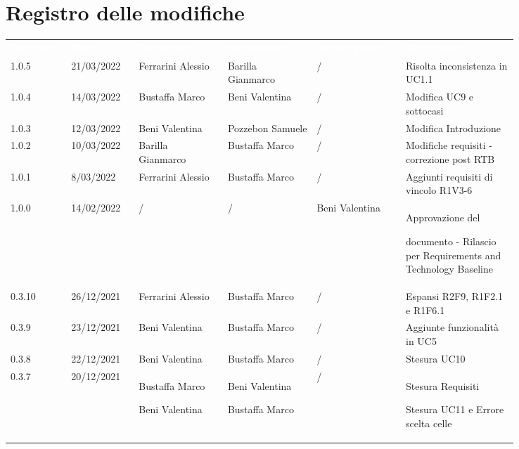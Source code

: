\section*{Registro delle modifiche}

{\renewcommand{\arraystretch}{1.5}
\scriptsize
\begin{tabular}{p{0.10\linewidth}p{0.10\linewidth}p{0.15\linewidth}p{0.15\linewidth}p{0.15\linewidth}p{0.19\linewidth}}
	\rowcolor[RGB]{33, 73, 50}
	\textcolor{white}{\textbf{Versione}} & \textcolor{white}{\textbf{Data}} &
	\textcolor{white}{\textbf{Redattore}} & \textcolor{white}{\textbf{Verificatore}} &
	\textcolor{white}{\textbf{Approvatore}} & \textcolor{white}{\textbf{Descrizione}}\\
  \rowcolor[RGB]{233, 245, 206}
	1.0.5 & 21/03/2022 & Ferrarini Alessio & Barilla Gianmarco &/& Risolta inconsistenza in UC1.1\\
	\rowcolor[RGB]{216, 235, 171}
	1.0.4 & 14/03/2022 & Bustaffa Marco & Beni Valentina & / & Modifica UC9 e sottocasi\\
	\rowcolor[RGB]{233, 245, 206}
	1.0.3 & 12/03/2022 & Beni Valentina & Pozzebon Samuele & / & Modifica Introduzione\\
	\rowcolor[RGB]{216, 235, 171}
	1.0.2 & 10/03/2022 & Barilla Gianmarco & Bustaffa Marco & / & Modifiche requisiti - correzione post RTB\\
	\rowcolor[RGB]{233, 245, 206}
	1.0.1 & 8/03/2022 & Ferrarini Alessio & Bustaffa Marco  &/& Aggiunti requisiti di vincolo R1V3-6\\
	\rowcolor[RGB]{216, 235, 171}
	1.0.0 & 14/02/2022 & / & / & Beni Valentina & Approvazione del \par documento - Rilascio per Requirements and Technology Baseline\\
	\rowcolor[RGB]{233, 245, 206}
	0.3.10 & 26/12/2021 & Ferrarini Alessio & Bustaffa Marco &/& Espansi R2F9, R1F2.1 e R1F6.1\\
	\rowcolor[RGB]{216, 235, 171}
	0.3.9 & 23/12/2021 & Beni Valentina& Bustaffa Marco &/& Aggiunte funzionalità in UC5\\
	\rowcolor[RGB]{233, 245, 206}
	0.3.8 & 22/12/2021 & Beni Valentina& Bustaffa Marco &/& Stesura UC10\\
	\rowcolor[RGB]{216, 235, 171}
	0.3.7 & 20/12/2021 & Bustaffa Marco \par Beni Valentina & Beni Valentina \par Bustaffa Marco & /& Stesura Requisiti \par Stesura UC11 e Errore scelta celle\\

\end{tabular}}

